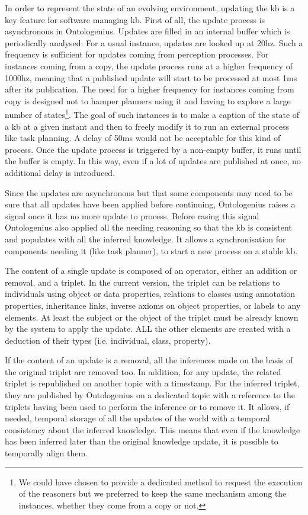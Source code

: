 In order to represent the state of an evolving environment, updating the \acrshort{kb} is a key feature for software managing \acrshort{kb}. First of all, the update process is asynchronous in Ontologenius. Updates are filled in an internal buffer which is periodically analysed. For a usual instance, updates are looked up at 20hz. Such a frequency is sufficient for updates coming from perception processes. For instances coming from a copy, the update process runs at a higher frequency of 1000hz, meaning that a published update will start to be processed at most 1ms after its publication. The need for a higher frequency for instances coming from copy is designed not to hamper planners using it and having to explore a large number of states\footnote{We could have chosen to provide a dedicated method to request the execution of the reasoners but we preferred to keep the same mechanism among the instances, whether they come from a copy or not.}. The goal of such instances is to make a caption of the state of a \acrshort{kb} at a given instant and then to freely modify it to run an external process like task planning. A delay of 50ms would not be acceptable for this kind of process. Once the update process is triggered by a non-empty buffer, it runs until the buffer is empty. In this way, even if a lot of updates are published at once, no additional delay is introduced.

Since the updates are asynchronous but that some components may need to be sure that all updates have been applied before continuing, Ontologenius raises a signal once it has no more update to process. Before rasing this signal Ontologenius also applied all the needing reasoning so that the \acrshort{kb} is consistent and populates with all the inferred knowledge. It allows a synchronisation for components needing it (like task planner), to start a new process on a stable \acrshort{kb}.

The content of a single update is composed of an operator, either an addition or removal, and a triplet. In the current version, the triplet can be relations to individuals using object or data properties, relations to classes using annotation properties, inheritance links, inverse axioms on object properties, or labels to any elements. At least the subject or the object of the triplet must be already known by the system to apply the update. ALL the other elements are created with a deduction of their types (i.e. individual, class, property).

If the content of an update is a removal, all the inferences made on the basis of the original triplet are removed too. In addition, for any update, the related triplet is republished on another topic with a timestamp. For the inferred triplet, they are published by Ontologenius on a dedicated topic with a reference to the triplets having been used to perform the inference or to remove it. It allows, if needed, temporal storage of all the updates of the world with a temporal consistency about the inferred knowledge. This means that even if the knowledge has been inferred later than the original knowledge update, it is possible to temporally align them.


